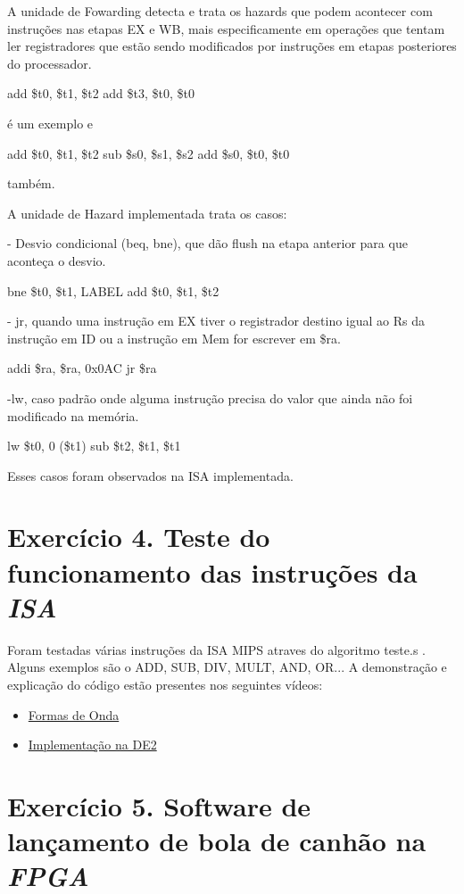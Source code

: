 \documentclass[12pt]{article}
\begin{document}
A unidade de Fowarding detecta e trata os hazards que podem acontecer com instruções nas etapas EX e WB, mais especificamente em operações que tentam ler registradores que estão sendo modificados por instruções em etapas posteriores do processador.

 add \$t0, \$t1, \$t2 
 add \$t3, \$t0, \$t0 

é um exemplo e

 add \$t0, \$t1, \$t2 
 sub \$s0, \$s1, \$s2 
 add \$s0, \$t0, \$t0 

também.

A unidade de Hazard implementada trata os casos:

-  Desvio condicional (beq, bne), que dão flush na etapa anterior para que aconteça o desvio.

 bne \$t0, \$t1, LABEL
 add \$t0, \$t1, \$t2

- jr, quando uma instrução em EX tiver o registrador destino igual ao Rs da instrução em ID ou a instrução em Mem for escrever em \$ra.

 addi \$ra, \$ra, 0x0AC 
 jr \$ra 

-lw, caso padrão onde alguma instrução precisa do valor que ainda não foi modificado na memória.

lw \$t0, 0 (\$t1)
sub \$t2, \$t1, \$t1


Esses casos foram observados na ISA implementada.

\section{Exercício 4. Teste do funcionamento das instruções da \textit{ISA} }
\label{sec:testeisa}
Foram testadas várias instruções da ISA MIPS atraves do algoritmo teste.s . Alguns exemplos são o ADD, SUB, DIV, MULT, AND, OR...
A demonstração e explicação do código estão presentes nos seguintes vídeos:

\begin{itemize}
\item \href{https://youtu.be/u5eFv9_BDSw}{Formas de Onda}
\item \href{https://youtu.be/PA9af2_Dhi4}{Implementação na DE2} 
\end{itemize}


\section{Exercício 5. Software de lançamento de bola de canhão na \textit{FPGA}}
\label{sec:canhao}
\end{document}
